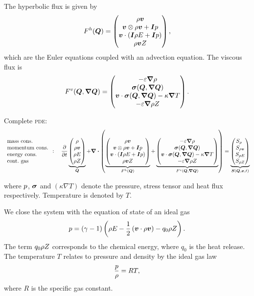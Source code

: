 \newcommand{\viscFluxDef}{
  \begin{pmatrix}
     -\diffCoeff \gradient{\Qrho}\\
     \stressT (\Q, \gradQ)  \\
     \Qv \cdot \stressT (\Q, \gradQ) - \kappa \gradient{T}\\
     -\diffCoeff \gradient{\QZ}
   \end{pmatrix}
}

The hyperbolic flux is given by
\begin{equation}
  \label{eq:hyper-flux}
  F^{h}(\bm{Q}) = \begin{pmatrix} \rho \bm{v} \\ \bm{v} \otimes \rho \bm{v} + \bm{I} p \\ \bm{v} \cdot (\bm{I} \rho E + \bm{I} p) \\ \rho \bm{v} Z \end{pmatrix},
\end{equation}
which are the Euler equations coupled with an advection equation.
The viscous flux is
\begin{equation}
  \label{eq:visc-flux}
  \viscFlux(\Q, \gradQ) = \viscFluxDef.
\end{equation}


Complete \textsc{pde}:
\begin{equation}
 \begin{array}{l}
 \text{mass cons.} \\
 \text{momentum cons.} \\
 \text{energy cons.} \\
 \text{cont.\ gas} 
\end{array}
:
\quad
  \pdv{}{t}
  \underbrace{
  \begin{pmatrix}
    \Qrho\\
    \Qj\\
    \QE\\
    \QZ
    \end{pmatrix}}_{\Q}
  + 
  \divergence{
  \left(
   \underbrace{\hyperFluxDef}_{\hyperFlux(\Q)}
+
\underbrace{\viscFluxDef}_{\viscFlux(\Q, \gradQ)}
  \right)}
 =
  \underbrace{
  \begin{pmatrix}
    S_{\Qrho\phantom{\Qrho}}\\
    S_{\Qj}\\
    S_{\QE}\\
    S_{\QZ}
    \end{pmatrix}}_{\source(\Q, \bm{x}, t)}
\end{equation}

where $p$, $\bm{\sigma}$ and $(\kappa \nabla T)$ denote the pressure, stress tensor and heat flux respectively.
Temperature is denoted by $T$.

We close the system with the equation of state of an ideal gas
\begin{equation}
  \label{eq:eos}
  p = (\gamma - 1) \left(\rho E - \frac{1}{2} \left(\bm{v} \cdot \rho \bm{v} \right)  - q_0 \rho Z \right).
\end{equation}
The term $q_0 \rho Z$ corresponds to the chemical energy, where $q_0$ is the heat release.
The temperature $T$ relates to pressure and density by the ideal gas law
\begin{equation}
  \label{eq:temperature}
 \frac{p}{\rho} = RT,
\end{equation}
where $R$ is the specific gas constant.


